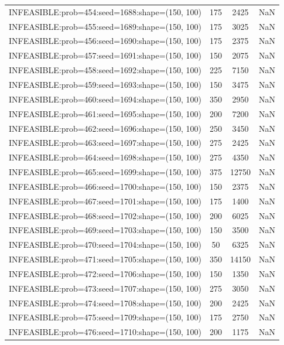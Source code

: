 \begin{longtable}{lccc}
INFEASIBLE:prob=454:seed=1688:shape=(150, 100) &      175 &  2425 &    NaN \\
INFEASIBLE:prob=455:seed=1689:shape=(150, 100) &      175 &  3025 &    NaN \\
INFEASIBLE:prob=456:seed=1690:shape=(150, 100) &      175 &  2375 &    NaN \\
INFEASIBLE:prob=457:seed=1691:shape=(150, 100) &      150 &  2075 &    NaN \\
INFEASIBLE:prob=458:seed=1692:shape=(150, 100) &      225 &  7150 &    NaN \\
INFEASIBLE:prob=459:seed=1693:shape=(150, 100) &      150 &  3475 &    NaN \\
INFEASIBLE:prob=460:seed=1694:shape=(150, 100) &      350 &  2950 &    NaN \\
INFEASIBLE:prob=461:seed=1695:shape=(150, 100) &      200 &  7200 &    NaN \\
INFEASIBLE:prob=462:seed=1696:shape=(150, 100) &      250 &  3450 &    NaN \\
INFEASIBLE:prob=463:seed=1697:shape=(150, 100) &      275 &  2425 &    NaN \\
INFEASIBLE:prob=464:seed=1698:shape=(150, 100) &      275 &  4350 &    NaN \\
INFEASIBLE:prob=465:seed=1699:shape=(150, 100) &      375 & 12750 &    NaN \\
INFEASIBLE:prob=466:seed=1700:shape=(150, 100) &      150 &  2375 &    NaN \\
INFEASIBLE:prob=467:seed=1701:shape=(150, 100) &      175 &  1400 &    NaN \\
INFEASIBLE:prob=468:seed=1702:shape=(150, 100) &      200 &  6025 &    NaN \\
INFEASIBLE:prob=469:seed=1703:shape=(150, 100) &      150 &  3500 &    NaN \\
INFEASIBLE:prob=470:seed=1704:shape=(150, 100) &       50 &  6325 &    NaN \\
INFEASIBLE:prob=471:seed=1705:shape=(150, 100) &      350 & 14150 &    NaN \\
INFEASIBLE:prob=472:seed=1706:shape=(150, 100) &      150 &  1350 &    NaN \\
INFEASIBLE:prob=473:seed=1707:shape=(150, 100) &      275 &  3050 &    NaN \\
INFEASIBLE:prob=474:seed=1708:shape=(150, 100) &      200 &  2425 &    NaN \\
INFEASIBLE:prob=475:seed=1709:shape=(150, 100) &      175 &  2750 &    NaN \\
INFEASIBLE:prob=476:seed=1710:shape=(150, 100) &      200 &  1175 &    NaN \\

\end{longtable}
